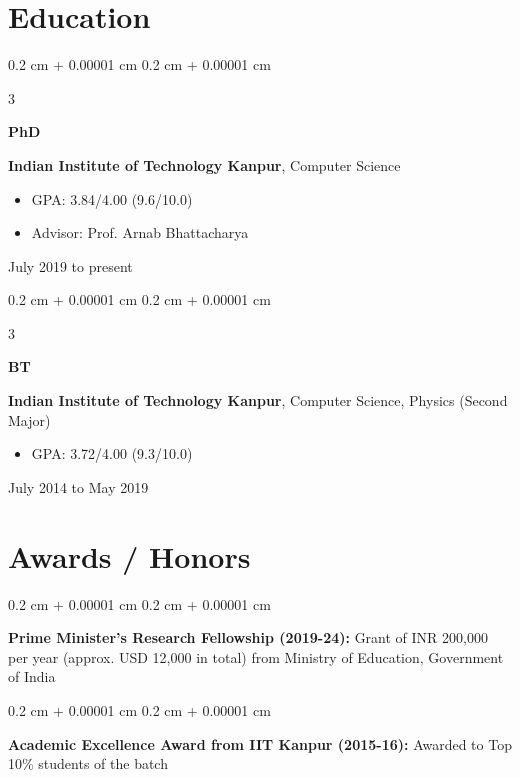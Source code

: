 \documentclass[12pt, letterpaper]{article}
\newenvironment{highlights}{
    \begin{itemize}[
        topsep=0.10 cm,
        parsep=0.10 cm,
        partopsep=0pt,
        itemsep=0pt,
        leftmargin=0.4 cm + 10pt
    ]
}{
    \end{itemize}
} %
\newenvironment{onecolentry}{
    \begin{adjustwidth}{
        0.2 cm + 0.00001 cm
    }{
        0.2 cm + 0.00001 cm
    }
}{
    \end{adjustwidth}
} %
\newenvironment{threecolentry}[3][]{
    \onecolentry
    \def\thirdColumn{#3}
    \setcolumnwidth{1 cm, \fill, 4.5 cm}
    \begin{paracol}{3}
    {\raggedright #2} \switchcolumn
}{
    \switchcolumn \raggedleft \thirdColumn
    \end{paracol}
    \endonecolentry
} %
\begin{document}
    
    \section{Education}



        
        \begin{threecolentry}{\textbf{PhD}}{
            July 2019 to present
        }
            \textbf{Indian Institute of Technology Kanpur}, Computer Science
            \begin{highlights}
                \item GPA: 3.84/4.00 (9.6/10.0)
                \item Advisor: Prof. Arnab Bhattacharya
            \end{highlights}
        \end{threecolentry}

        \vspace{0.2 cm}

        \begin{threecolentry}{\textbf{BT}}{
            July 2014 to May 2019
        }
            \textbf{Indian Institute of Technology Kanpur}, Computer Science, Physics (Second Major)
            \begin{highlights}
                \item GPA: 3.72/4.00 (9.3/10.0)
            \end{highlights}
        \end{threecolentry}


    
    \section{Awards / Honors}



        
        \begin{onecolentry}
            \textbf{Prime Minister's Research Fellowship (2019-24):} Grant of INR 200,000 per year (approx. USD 12,000 in total) from Ministry of Education, Government of India
        \end{onecolentry}

        \vspace{0.2 cm}

        \begin{onecolentry}
            \textbf{Academic Excellence Award from IIT Kanpur (2015-16):} Awarded to Top 10\% students of the batch
        \end{onecolentry}
\end{document}
